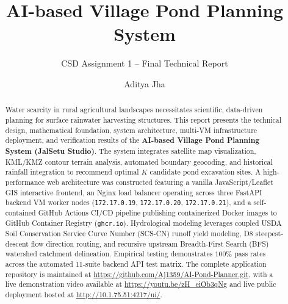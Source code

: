 \documentclass[manuscript,screen]{acmart}
\begin{document}
\title{AI-based Village Pond Planning System}
\subtitle{CSD Assignment 1 -- Final Technical Report}

\author{Aditya Jha}

\renewcommand{\shortauthors}{Aditya Jha}

\begin{abstract}
Water scarcity in rural agricultural landscapes necessitates scientific, data-driven planning for surface rainwater harvesting structures. This report presents the technical design, mathematical foundation, system architecture, multi-VM infrastructure deployment, and verification results of the \textbf{AI-based Village Pond Planning System (JalSetu Studio)}. The system integrates satellite map visualization, KML/KMZ contour terrain analysis, automated boundary geocoding, and historical rainfall integration to recommend optimal $K$ candidate pond excavation sites. A high-performance web architecture was constructed featuring a vanilla JavaScript/Leaflet GIS interactive frontend, an Nginx load balancer operating across three FastAPI backend VM worker nodes (\texttt{172.17.0.19}, \texttt{172.17.0.20}, \texttt{172.17.0.21}), and a self-contained GitHub Actions CI/CD pipeline publishing containerized Docker images to GitHub Container Registry (\texttt{ghcr.io}). Hydrological modeling leverages coupled USDA Soil Conservation Service Curve Number (SCS-CN) runoff yield modeling, D8 steepest-descent flow direction routing, and recursive upstream Breadth-First Search (BFS) watershed catchment delineation. Empirical testing demonstrates $100\%$ pass rates across the automated 11-suite backend API test matrix. The complete application repository is maintained at \url{https://github.com/Aj1359/AI-Pond-Planner.git}, with a live demonstration video available at \url{https://youtu.be/zH_eiQb3qNg} and live public deployment hosted at \url{http://10.1.75.51:4217/ui/}.
\end{abstract}


\maketitle
\end{document}
